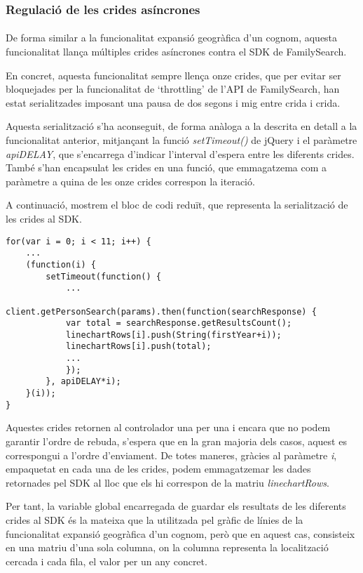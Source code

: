 \subsubsection{Regulació de les crides asíncrones}

\paragraph{}
De forma similar a la funcionalitat expansió geogràfica d’un cognom, aquesta funcionalitat llança múltiples crides asíncrones contra el SDK de FamilySearch.

En concret, aquesta funcionalitat sempre llença onze crides, que per evitar ser bloquejades per la funcionalitat de `throttling' de l’API de FamilySearch, han estat serialitzades imposant una pausa de dos segons i mig entre crida i crida.

Aquesta serialització s'ha aconseguit, de forma anàloga a la descrita en detall a la funcionalitat anterior, mitjançant la funció \emph{setTimeout()} de jQuery i el paràmetre \emph{apiDELAY}, que s'encarrega d'indicar l'interval d'espera entre les diferents crides. També s'han encapsulat les crides en una funció, que emmagatzema com a paràmetre a quina de les onze crides correspon la iteració.

A continuació, mostrem el bloc de codi reduït, que representa la serialització de les crides al SDK.

\begin{lstlisting}[style=rawOwn,caption={Separació manual de les crides asíncrones al SDK}]
for(var i = 0; i < 11; i++) {
    ...
    (function(i) {
        setTimeout(function() {
            ...
            client.getPersonSearch(params).then(function(searchResponse) {
            var total = searchResponse.getResultsCount();
            linechartRows[i].push(String(firstYear+i));
            linechartRows[i].push(total);
            ...
            });
        }, apiDELAY*i);
    }(i));
}
\end{lstlisting}

Aquestes crides retornen al controlador una per una i encara que no podem garantir l'ordre de rebuda, s’espera que en la gran majoria dels casos, aquest es correspongui a l’ordre d’enviament. De totes maneres, gràcies al paràmetre \emph{i}, empaquetat en cada una de les crides, podem emmagatzemar les dades retornades pel SDK al lloc que els hi correspon de la matriu \emph{linechartRows}.

Per tant, la variable global encarregada de guardar els resultats de les diferents crides al SDK és la mateixa que la utilitzada pel gràfic de línies de la funcionalitat expansió geogràfica d'un cognom, però que en aquest cas, consisteix en una matriu d'una sola columna, on la columna representa la localització cercada i cada fila, el valor per un any concret.

